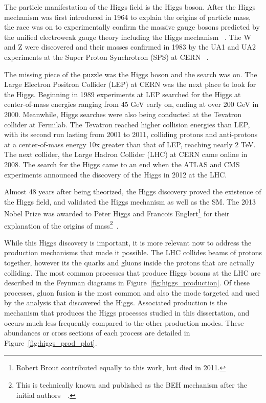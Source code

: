 The particle manifestation of the Higgs field is the Higgs boson. After the Higgs mechanism was first introduced in 1964 to explain the origins of particle mass,
the race was on to experimentally confirm the massive gauge bosons predicted by the unified electroweak gauge theory including the Higgs mechanism ~\cite{higgs}.
The W and Z were discovered and their masses confirmed in 1983 by the UA1 and UA2 experiments at the Super Proton Synchrotron (SPS) at CERN ~\cite{WandZdiscoveries}.

The missing piece of the puzzle was the Higgs boson and the search was on. The Large Electron Positron Collider (LEP) at CERN was the next place to look for the Higgs.
Beginning in 1989 experiments at LEP searched for the Higgs at center-of-mass energies ranging from 45 GeV early on, ending at over 200 GeV in 2000. Meanwhile, Higgs
searches were also being conducted at the Tevatron collider at Fermilab. The Tevatron reached higher collision energies than LEP, with its second run lasting from 2001
to 2011, colliding protons and anti-protons at a center-of-mass energy 10x greater than that of LEP, reaching nearly 2 TeV. The next collider, the Large Hadron Collider
(LHC) at CERN came online in 2008. The search for the Higgs came to an end when the ATLAS and CMS experiments announced the discovery of the Higgs in 2012 at the LHC. 

Almost 48 years after being theorized, the Higgs discovery proved the existence
of the Higgs field, and validated the Higgs mechanism as well as the SM. The 2013 Nobel Prize was awarded to
Peter Higgs and Francois Englert\footnote{Robert Brout contributed equally to this work, but died in 2011.} for their explanation of the origins of mass\footnote{This is
technically known and published as the BEH mechanism after the initial authors~\cite{1964_prl_higgs}~\cite{1964_prl_englert}.}~\cite{NP13}.

While this Higgs discovery is important, it is more relevant now to address the production mechanisms that made it possible. The LHC collides beams of protons together,
however its the quarks and gluons inside the protons that are actually colliding. The most common processes that produce Higgs bosons at the LHC are described in the
Feynman diagrams in Figure~\ref{fig:higgs_production}. Of these processes, gluon fusion is the most common and also the mode targeted and used by the analysis that
discovered the Higgs. Associated production is the mechanism that produces the Higgs processes studied in this dissertation, and occurs much less frequently compared to
the other production modes. These abundances or cross sections of each process are detailed in Figure~\ref{fig:higgs_prod_plot}.


